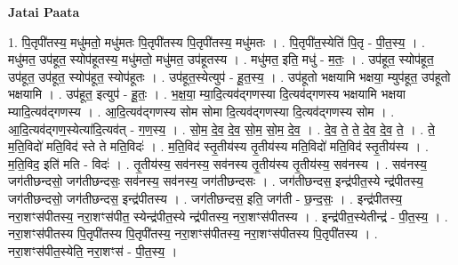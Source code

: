 \documentclass[17pt]{extarticle}
\begin{document}
\textbf{Jatai Paata} \newline

1. पि॒तृपी॑तस्य॒ मधु॑मतो॒ मधु॑मतः पि॒तृपी॑तस्य पि॒तृपी॑तस्य॒ मधु॑मतः । . पि॒तृपी॑त॒स्येति॑ पि॒तृ - पी॒त॒स्य॒ । . मधु॑मत॒ उप॑हूत॒ स्योप॑हूतस्य॒ मधु॑मतो॒ मधु॑मत॒ उप॑हूतस्य । . मधु॑मत॒ इति॒ मधु॑ - म॒तः॒ । . उप॑हूत॒ स्योप॑हूत॒ उप॑हूत॒ उप॑हूत॒ स्योप॑हूत॒ स्योप॑हूतः । . उप॑हूत॒स्येत्युप॑ - हू॒त॒स्य॒ । . उप॑हूतो भक्षयामि भक्षया॒ म्युप॑हूत॒ उप॑हूतो भक्षयामि । . उप॑हूत॒ इत्युप॑ - हू॒तः॒ । . भ॒क्ष॒या॒ म्या॒दि॒त्यव॑द्‍गणस्या दि॒त्यव॑द्‍गणस्य भक्षयामि भक्षया म्यादि॒त्यव॑द्‍गणस्य । . आ॒दि॒त्यव॑द्‍गणस्य सोम सोमा दि॒त्यव॑द्‍गणस्या दि॒त्यव॑द्‍गणस्य सोम । . आ॒दि॒त्यव॑द्‍गण॒स्येत्या॑दि॒त्यव॑त् - ग॒ण॒स्य॒ । . सो॒म॒ दे॒व॒ दे॒व॒ सो॒म॒ सो॒म॒ दे॒व॒ । . दे॒व॒ ते॒ ते॒ दे॒व॒ दे॒व॒ ते॒ । . ते॒ म॒ति॒विदो॑ मति॒विद॑ स्ते ते मति॒विदः॑ । . म॒ति॒विद॑ स्तृ॒तीय॑स्य तृ॒तीय॑स्य मति॒विदो॑ मति॒विद॑ स्तृ॒तीय॑स्य । . म॒ति॒विद॒ इति॑ मति - विदः॑ । . तृ॒तीय॑स्य॒ सव॑नस्य॒ सव॑नस्य तृ॒तीय॑स्य तृ॒तीय॑स्य॒ सव॑नस्य । . सव॑नस्य॒ जग॑तीछन्दसो॒ जग॑तीछन्दसः॒ सव॑नस्य॒ सव॑नस्य॒ जग॑तीछन्दसः । . जग॑तीछन्दस॒ इन्द्र॑पीत॒स्ये न्द्र॑पीतस्य॒ जग॑तीछन्दसो॒ जग॑तीछन्दस॒ इन्द्र॑पीतस्य । . जग॑तीछन्दस॒ इति॒ जग॑ती - छ॒न्द॒सः॒ । . इन्द्र॑पीतस्य॒ नरा॒शꣳस॑पीतस्य॒ नरा॒शꣳस॑पीत॒ स्येन्द्र॑पीत॒स्ये न्द्र॑पीतस्य॒ नरा॒शꣳस॑पीतस्य । . इन्द्र॑पीत॒स्येतीन्द्र॑ - पी॒त॒स्य॒ । . नरा॒शꣳस॑पीतस्य पि॒तृपी॑तस्य पि॒तृपी॑तस्य॒ नरा॒शꣳस॑पीतस्य॒ नरा॒शꣳस॑पीतस्य पि॒तृपी॑तस्य । . नरा॒शꣳस॑पीत॒स्येति॒ नरा॒शꣳस॑ - पी॒त॒स्य॒ । \newline
\end{document}
